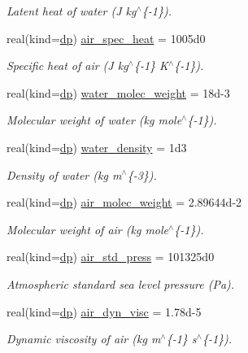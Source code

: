 \begin{DoxyCompactItemize}
\begin{DoxyCompactList}\small\item\em Latent heat of water (J kg$^\wedge$\{-\/1\}). \end{DoxyCompactList}\item 
real(kind=\mbox{\hyperlink{namespacepmc__constants_a396b7709ed4da67dac74cb46a1466ed6}{dp}}) \mbox{\hyperlink{structpmc__constants_1_1const__t_af3b166e76dfa3c31339781be2b06452b}{air\+\_\+spec\+\_\+heat}} = 1005d0
\begin{DoxyCompactList}\small\item\em Specific heat of air (J kg$^\wedge$\{-\/1\} K$^\wedge$\{-\/1\}). \end{DoxyCompactList}\item 
real(kind=\mbox{\hyperlink{namespacepmc__constants_a396b7709ed4da67dac74cb46a1466ed6}{dp}}) \mbox{\hyperlink{structpmc__constants_1_1const__t_a11c5b97533dded1ba8447d6215ca0d5f}{water\+\_\+molec\+\_\+weight}} = 18d-\/3
\begin{DoxyCompactList}\small\item\em Molecular weight of water (kg mole$^\wedge$\{-\/1\}). \end{DoxyCompactList}\item 
real(kind=\mbox{\hyperlink{namespacepmc__constants_a396b7709ed4da67dac74cb46a1466ed6}{dp}}) \mbox{\hyperlink{structpmc__constants_1_1const__t_a1853eba6f14fb9c5d408ee47124ba7dc}{water\+\_\+density}} = 1d3
\begin{DoxyCompactList}\small\item\em Density of water (kg m$^\wedge$\{-\/3\}). \end{DoxyCompactList}\item 
real(kind=\mbox{\hyperlink{namespacepmc__constants_a396b7709ed4da67dac74cb46a1466ed6}{dp}}) \mbox{\hyperlink{structpmc__constants_1_1const__t_a77edc9b47ea698fb737fd0e99ec067ff}{air\+\_\+molec\+\_\+weight}} = 2.\+89644d-\/2
\begin{DoxyCompactList}\small\item\em Molecular weight of air (kg mole$^\wedge$\{-\/1\}). \end{DoxyCompactList}\item 
real(kind=\mbox{\hyperlink{namespacepmc__constants_a396b7709ed4da67dac74cb46a1466ed6}{dp}}) \mbox{\hyperlink{structpmc__constants_1_1const__t_ac61b22bf38d040321948a20d4380d946}{air\+\_\+std\+\_\+press}} = 101325d0
\begin{DoxyCompactList}\small\item\em Atmospheric standard sea level pressure (Pa). \end{DoxyCompactList}\item 
real(kind=\mbox{\hyperlink{namespacepmc__constants_a396b7709ed4da67dac74cb46a1466ed6}{dp}}) \mbox{\hyperlink{structpmc__constants_1_1const__t_a3ad84a6c86dd201773e760ceceff23ea}{air\+\_\+dyn\+\_\+visc}} = 1.\+78d-\/5
\begin{DoxyCompactList}\small\item\em Dynamic viscosity of air (kg m$^\wedge$\{-\/1\} s$^\wedge$\{-\/1\}). \end{DoxyCompactList}\end{DoxyCompactItemize}


